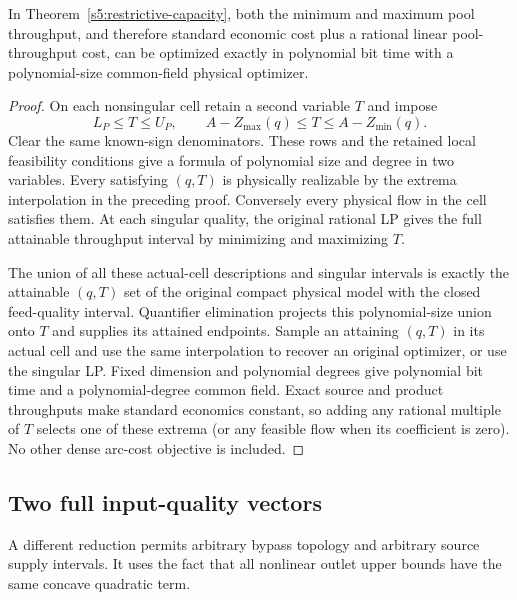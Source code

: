 \begin{corollary}
\label{s5:throughput-optimization}
In Theorem~\ref{s5:restrictive-capacity}, both the minimum and maximum
pool throughput, and therefore standard economic cost plus a rational
linear pool-throughput cost, can be optimized exactly in polynomial bit
time with a polynomial-size common-field physical optimizer.
\end{corollary}
\begin{proof}
On each nonsingular cell retain a second variable $T$ and impose
\[
 L_P\le T\le U_P,\qquad
 A-Z_{\max}(q)\le T\le A-Z_{\min}(q).
\]
Clear the same known-sign denominators. These rows and the retained
local feasibility conditions give a formula of polynomial size and
degree in two variables. Every satisfying $(q,T)$ is physically
realizable by the extrema interpolation in the preceding proof.
Conversely every physical flow in the cell satisfies them. At each
singular quality, the original rational LP gives the full attainable
throughput interval by minimizing and maximizing $T$.

The union of all these actual-cell descriptions and singular intervals
is exactly the attainable $(q,T)$ set of the original compact physical
model with the closed feed-quality interval. Quantifier elimination
projects this polynomial-size union onto $T$ and supplies its attained
endpoints. Sample an attaining $(q,T)$ in its actual cell and use the
same interpolation to recover an original optimizer, or use the
singular LP. Fixed dimension and polynomial degrees give polynomial bit
time and a polynomial-degree common field. Exact source and product
throughputs make standard economics constant, so adding any rational
multiple of $T$ selects one of these extrema (or any feasible flow when
its coefficient is zero). No other dense arc-cost objective is included.
\end{proof}

\subsection{Two full input-quality vectors}\label{s5:two-vectors}

A different reduction permits arbitrary bypass topology and arbitrary
source supply intervals. It uses the fact that all nonlinear outlet
upper bounds have the same concave quadratic term.

